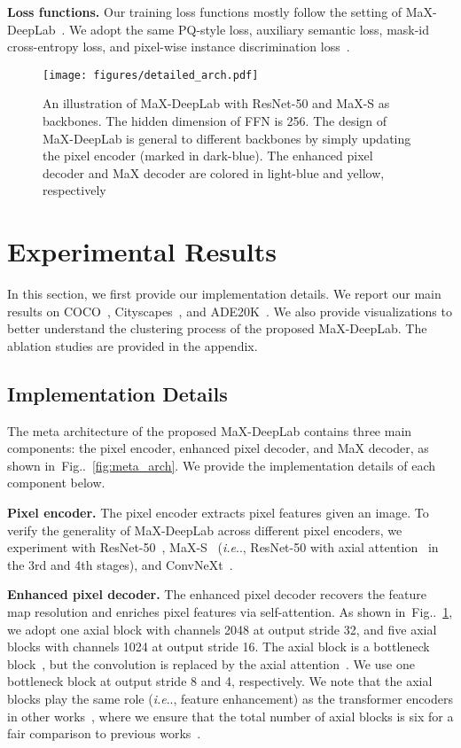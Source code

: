 \documentclass[runningheads]{llncs}
\makeatletter
\DeclareRobustCommand\onedot{\futurelet\@let@token\@onedot}
\def\@onedot{\ifx\@let@token.\else.\null\fi\xspace}
\def\ie{\emph{i.e}\onedot} \def\Ie{\emph{I.e}\onedot}
\newcommand{\figref}[1]{Fig\onedot~\ref{#1}}
\makeatother
\begin{document}
\textbf{Loss functions.}\quad
Our training loss functions mostly follow the setting of MaX-DeepLab~\cite{wang2021max}.
We adopt the same PQ-style loss, auxiliary semantic loss, mask-id cross-entropy loss, and pixel-wise instance discrimination loss~\cite{yu2022cmt}.

\label{sec:method} \begin{figure}[t]
    \centering
    \texttt{[image: figures/detailed\_arch.pdf]}
    \caption{An illustration of MaX-DeepLab with ResNet-50 and MaX-S as backbones. The hidden dimension of FFN is 256. The design of MaX-DeepLab is general to different backbones by simply updating the pixel encoder (marked in dark-blue). The enhanced pixel decoder and MaX decoder are colored in light-blue and yellow, respectively}
    \label{fig:detailed_kmax}
\end{figure}

\section{Experimental Results}

In this section, we first provide our implementation details. We report our main results on COCO~\cite{lin2014microsoft}, Cityscapes~\cite{Cordts2016Cityscapes}, and ADE20K~\cite{zhou2017scene}. We also provide visualizations to better understand the clustering process of the proposed MaX-DeepLab.
The ablation studies are provided in the appendix.

\subsection{Implementation Details}

The meta architecture of the proposed MaX-DeepLab contains three main components: the pixel encoder, enhanced pixel decoder, and MaX decoder, as shown in~\figref{fig:meta_arch}. We provide the implementation details of each component below.

\textbf{Pixel encoder.}\quad
The pixel encoder extracts pixel features given an image.
To verify the generality of MaX-DeepLab across different pixel encoders, we experiment with ResNet-50~\cite{he2016deep}, MaX-S~\cite{wang2021max} (\ie, ResNet-50 with axial attention~\cite{wang2020axial} in the 3rd and 4th stages), and ConvNeXt~\cite{liu2022convnet}.

\textbf{Enhanced pixel decoder.}\quad
The enhanced pixel decoder recovers the feature map resolution and  enriches pixel features via self-attention.
As shown in~\figref{fig:detailed_kmax}, we adopt one axial block with channels 2048 at output stride 32, and five axial blocks with channels 1024 at output stride 16. The axial block is a bottleneck block~\cite{he2016deep}, but the  convolution is replaced by the axial attention~\cite{wang2020axial}.
We use one bottleneck block at output stride 8 and 4, respectively.
We note that the axial blocks play the same role (\ie, feature enhancement) as the transformer encoders in other works~\cite{carion2020end,cheng2021per,yu2022cmt}, where we ensure that the total number of axial blocks is six for a fair comparison to previous works~\cite{carion2020end,cheng2021per,yu2022cmt}. 
\end{document}
